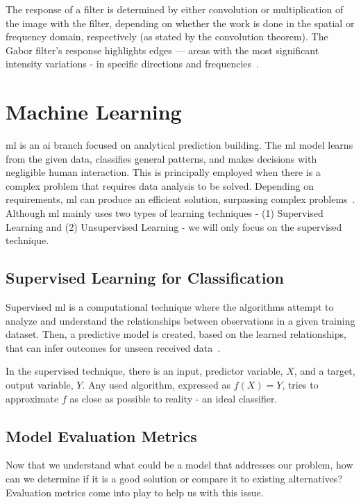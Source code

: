 The response of a filter is determined by either convolution or multiplication of the image with the filter, depending on whether the work is done in the spatial or frequency domain, respectively (as stated by the convolution theorem). The Gabor filter's response highlights edges — areas with the most significant intensity variations - in specific directions and frequencies~\cite{abbasian_ardakani_interpretation_2022}.

\section{Machine Learning}\label{sec:ml}
\acf{ml} is an \acf{ai} branch focused on analytical prediction building.
The \ac{ml} model learns from the given data, classifies general patterns, and makes decisions with negligible human interaction. This is principally employed when there is a complex problem that requires data analysis to be solved. Depending on requirements, \ac{ml} can produce an efficient solution, surpassing complex problems~\cite{naidu_review_2023}.
Although \ac{ml} mainly uses two types of learning techniques - (1) Supervised Learning and (2) Unsupervised Learning -  we will only focus on the supervised technique.

\subsection{Supervised Learning for Classification}

Supervised \ac{ml} is a computational technique where the algorithms attempt to analyze and understand the relationships between observations in a given training dataset. Then, a predictive model is created, based on the learned relationships, that can infer outcomes for unseen received data~\cite{naidu_review_2023}.

In the supervised technique, there is an input, predictor variable, $X$, and a target, output variable, $Y$.
Any used algorithm, expressed as $f(X) = Y$, tries to approximate $f$ as close as possible to reality - an ideal classifier.

\subsection{Model Evaluation Metrics}\label{subsec:metrics}

Now that we understand what could be a model that addresses our problem, how can we determine if it is a good solution or compare it to existing alternatives? Evaluation metrics come into play to help us with this issue.

